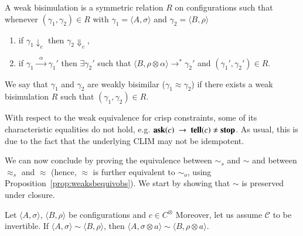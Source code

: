 \documentclass[main.tex]{subfiles}
\begin{document}
\begin{definition}\label{def:weak} A weak bisimulation is a symmetric
relation $R$ on configurations such that whenever $(\gamma_1, \gamma_2) \in R$ with $\gamma_1 = \langle A, \sigma \rangle$ and $\gamma_2 = \langle B, \rho\rangle$
\begin{enumerate}
\item if $\gamma_1 \downarrow_c$ then $\gamma_2 \Downarrow_c$,
\item if $\gamma_1 \xrightarrow{\; \; \alpha\;  \;} \gamma_1'$ then $\exists \gamma_2'$ such that $\langle B, \rho \otimes \alpha \rangle \longrightarrow^* \gamma_2'$ and $(\gamma_1', \gamma_2') \in R$.
\end{enumerate}
We say that $\gamma_1$ and $\gamma_2$ are weakly bisimilar ($\gamma_1 \approx \gamma_2$) if there exists a weak bisimulation $R$ such that $(\gamma_1, \gamma_2) \in R$.
\end{definition}

With respect to the weak equivalence for crisp constraints, some of its characteristic equalities do not hold, e.g.
${\bf ask}(c) \ \rightarrow \ {\bf tell}({c}) \not  \approx {\bf stop}$. As usual, this is due to the fact that the underlying CLIM may not be idempotent.

We can now conclude by proving the equivalence between $\sim_{\mathit{s}}$ and $\sim$ and between $\approx_{\mathit{s}}$ and $\approx$ (hence, $\approx$ is further equivalent to $\sim_o$, using Proposition~\ref{prop:weaksbequivobs}). We start by showing that $\sim$ is preserved under closure.

\begin{lemma}\label{lemma:equality}
Let $\langle A, \sigma\rangle$, $\langle B, \rho\rangle$ be configurations and $c \in C^\otimes$
 Moreover, let us assume $\mathcal{C}$ to be invertible. 
If $\langle A, \sigma\rangle \sim \langle B, \rho\rangle$, then $\langle A, \sigma \otimes a \rangle \sim \langle B, \rho \otimes a\rangle$.
\end{lemma}
\end{document}
